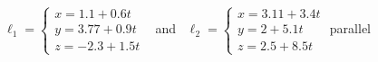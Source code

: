 {$\ell_1 = \begin{cases}x=1.1+0.6t\\y=3.77+0.9t\\z=-2.3+1.5t\end{cases}$ \ and \ 
$\ell_2 = \begin{cases}x=3.11+3.4t\\y=2+5.1t\\z=2.5+8.5t\end{cases}$
}
{parallel
}

